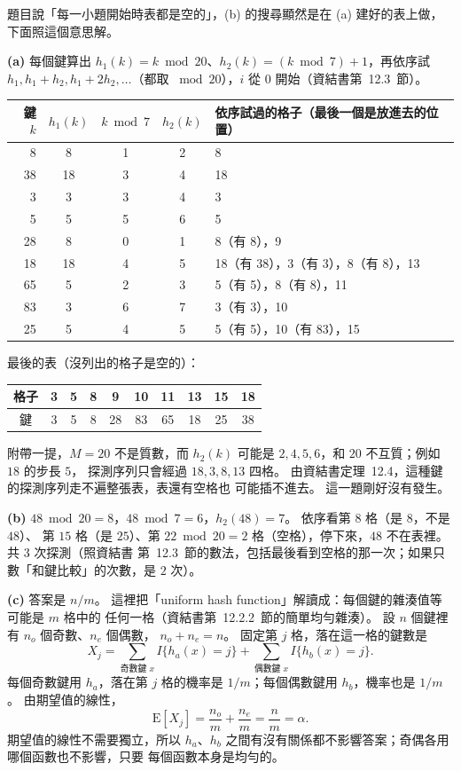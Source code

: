 \begin{pastsoln}
題目說「每一小題開始時表都是空的」，(b) 的搜尋顯然是在 (a) 建好的表上做，下面照這個意思解。

\textbf{(a)} 每個鍵算出 $h_1(k) = k \bmod 20$、$h_2(k) = (k \bmod 7) + 1$，再依序試
$h_1, h_1 + h_2, h_1 + 2h_2, \ldots$（都取 $\bmod 20$），$i$ 從 $0$ 開始（資結書第~12.3~節）。
\begin{center}
\small
\begin{tabular}{rcccl}
\toprule
鍵 $k$ & $h_1(k)$ & $k \bmod 7$ & $h_2(k)$ & 依序試過的格子（最後一個是放進去的位置） \\
\midrule
8 & 8 & 1 & 2 & 8 \\
38 & 18 & 3 & 4 & 18 \\
3 & 3 & 3 & 4 & 3 \\
5 & 5 & 5 & 6 & 5 \\
28 & 8 & 0 & 1 & 8（有 8），9 \\
18 & 18 & 4 & 5 & 18（有 38），3（有 3），8（有 8），13 \\
65 & 5 & 2 & 3 & 5（有 5），8（有 8），11 \\
83 & 3 & 6 & 7 & 3（有 3），10 \\
25 & 5 & 4 & 5 & 5（有 5），10（有 83），15 \\
\bottomrule
\end{tabular}
\end{center}
最後的表（沒列出的格子是空的）：
\begin{center}
\small
\begin{tabular}{*{10}{c}}
\toprule
格子 & 3 & 5 & 8 & 9 & 10 & 11 & 13 & 15 & 18 \\
\midrule
鍵 & 3 & 5 & 8 & 28 & 83 & 65 & 18 & 25 & 38 \\
\bottomrule
\end{tabular}
\end{center}
附帶一提，$M = 20$ 不是質數，而 $h_2(k)$ 可能是 $2, 4, 5, 6$，和 $20$ 不互質；例如 $18$ 的步長 $5$，
探測序列只會經過 $18, 3, 8, 13$ 四格。 由資結書定理~12.4，這種鍵的探測序列走不遍整張表，表還有空格也
可能插不進去。 這一題剛好沒有發生。

\textbf{(b)} $48 \bmod 20 = 8$，$48 \bmod 7 = 6$，$h_2(48) = 7$。 依序看第 $8$ 格（是 $8$，不是 $48$）、
第 $15$ 格（是 $25$）、第 $22 \bmod 20 = 2$ 格（空格），停下來，$48$ 不在表裡。 共 $3$ 次探測（照資結書
第~12.3~節的數法，包括最後看到空格的那一次；如果只數「和鍵比較」的次數，是 $2$ 次）。

\textbf{(c)} 答案是 $n/m$。 這裡把「uniform hash function」解讀成：每個鍵的雜湊值等可能是 $m$ 格中的
任何一格（資結書第~12.2.2~節的簡單均勻雜湊）。 設 $n$ 個鍵裡有 $n_o$ 個奇數、$n_e$ 個偶數，
$n_o + n_e = n$。 固定第 $j$ 格，落在這一格的鍵數是
\[
X_j = \sum_{\text{奇數鍵 } x} I\{h_a(x) = j\} + \sum_{\text{偶數鍵 } x} I\{h_b(x) = j\}.
\]
每個奇數鍵用 $h_a$，落在第 $j$ 格的機率是 $1/m$；每個偶數鍵用 $h_b$，機率也是 $1/m$。 由期望值的線性，
\[
\mathrm{E}[X_j] = \frac{n_o}{m} + \frac{n_e}{m} = \frac{n}{m} = \alpha .
\]
期望值的線性不需要獨立，所以 $h_a$、$h_b$ 之間有沒有關係都不影響答案；奇偶各用哪個函數也不影響，只要
每個函數本身是均勻的。
\end{pastsoln}
